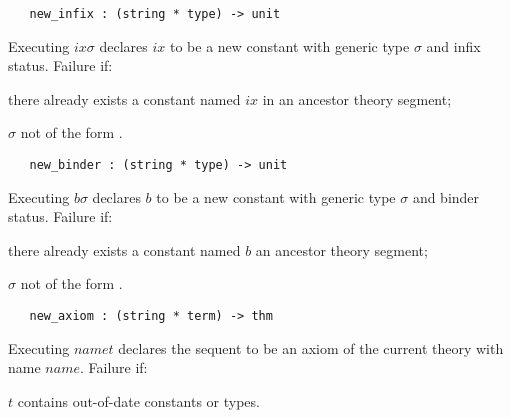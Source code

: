 \begin{boxed}
\begin{verbatim}
   new_infix : (string * type) -> unit
\end{verbatim}\end{boxed}


\noindent Executing $ix$$\sigma$\ml{)}
declares $ix$ to be a new constant with generic type $\sigma$ and
infix status.
Failure if:
\begin{myenumerate}
\item there already exists a constant named $ix$ in an ancestor theory segment;
\item $\sigma$ not of the form .
\end{myenumerate}


\begin{boxed}
\begin{verbatim}
   new_binder : (string * type) -> unit
\end{verbatim}\end{boxed}


\noindent Executing $b$$\sigma$\ml{)}
declares $b$ to be a new constant with generic type $\sigma$ and
binder status.
Failure if:
\begin{myenumerate}
\item there already exists a constant named $b$ an ancestor theory segment;
\item $\sigma$ not of the form .
\end{myenumerate}

\begin{boxed}
\begin{verbatim}
   new_axiom : (string * term) -> thm
\end{verbatim}\end{boxed}


\noindent Executing $name$$t$\ml{)} declares the
sequent
 to be an axiom of the current theory with name $name$.
Failure if:
\begin{myenumerate}
\item $t$ contains out-of-date constants or types.
\end{myenumerate}


